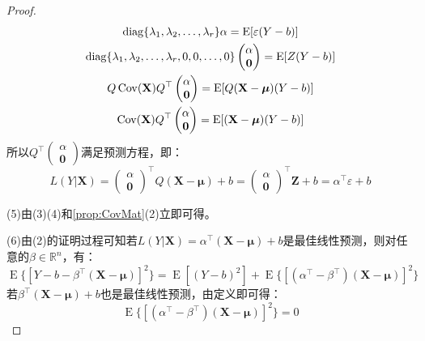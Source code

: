 \begin{proof}
\begin{gather*}
		\operatorname{diag}\{\lambda_1, \lambda_2, \dots, \lambda_{r}\}\alpha=\operatorname{E}[\varepsilon(Y-b)] \\
		\operatorname{diag}\{\lambda_1, \lambda_2, \dots, \lambda_{r},0,0,\dots,0\}
		\begin{pmatrix}
			\alpha \\
			\mathbf{0}	
		\end{pmatrix}=\operatorname{E}[Z(Y-b)] \\
		Q\operatorname{Cov}(\mathbf{X})Q^{\top}
		\begin{pmatrix}
			\alpha \\
			\mathbf{0}	
		\end{pmatrix}=\operatorname{E}[Q(\mathbf{X}-\boldsymbol{\mu})(Y-b)] \\
		\operatorname{Cov}(\mathbf{X})Q^{\top}
		\begin{pmatrix}
			\alpha \\
			\mathbf{0}	
		\end{pmatrix}=\operatorname{E}[(\mathbf{X}-\boldsymbol{\mu})(Y-b)] 
	\end{gather*}
	所以$Q^{\top}
	\begin{pmatrix}
		\alpha \\
		\mathbf{0}
	\end{pmatrix}$满足预测方程，即：
	\begin{equation*}
		L(Y|\mathbf{X})=
		\begin{pmatrix}
			\alpha \\
			\mathbf{0}
		\end{pmatrix}^{\top}Q(\mathbf{X}-\boldsymbol{\mu})+b=
		\begin{pmatrix}
		\alpha \\
		\mathbf{0}
		\end{pmatrix}^{\top}\mathbf{Z}+b=\alpha^{\top}\varepsilon+b
	\end{equation*}\par
	(5)由(3)(4)和\cref{prop:CovMat}(2)立即可得。\par
	(6)由(2)的证明过程可知若$L(Y|\mathbf{X})=\alpha^{\top}(\mathbf{X}-\boldsymbol{\mu})+b$是最佳线性预测，则对任意的$\beta\in\mathbb{R}^{n}$，有：
	\begin{equation*}
		\operatorname{E}\{[Y-b-\beta^{\top}(\mathbf{X}-\boldsymbol{\mu})]^2\}=\operatorname{E}[(Y-b)^2]+\operatorname{E}\{[(\alpha^{\top}-\beta^{\top})(\mathbf{X}-\boldsymbol{\mu})]^2\}
	\end{equation*}
	若$\beta^{\top}(\mathbf{X}-\boldsymbol{\mu})+b$也是最佳线性预测，由定义即可得：
	\begin{equation*}
		\operatorname{E}\{[(\alpha^{\top}-\beta^{\top})(\mathbf{X}-\boldsymbol{\mu})]^2\}=0

\end{equation*}
\end{proof}
